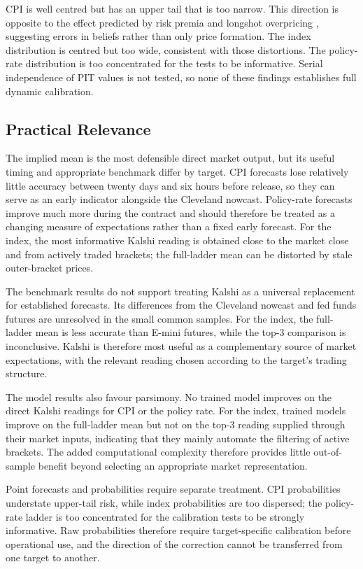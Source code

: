 \documentclass[12pt,a4paper]{report}
\begin{document}
CPI is well centred but has an upper tail that is too narrow. This direction is
opposite to the effect predicted by risk premia and longshot overpricing
\parencite{kitsul2013, burgi2025}, suggesting errors in beliefs rather than only
price formation. The index distribution is centred but too wide, consistent
with those distortions. The policy-rate distribution is too concentrated for
the tests to be informative. Serial independence of PIT values is not tested,
so none of these findings establishes full dynamic calibration.

\subsection{Practical Relevance}

The implied mean is the most defensible direct market output, but its useful
timing and appropriate benchmark differ by target. CPI forecasts lose relatively
little accuracy between twenty days and six hours before release, so they can
serve as an early indicator alongside the Cleveland nowcast. Policy-rate
forecasts improve much more during the contract and should therefore be treated
as a changing measure of expectations rather than a fixed early forecast.
For the index, the most informative Kalshi reading is obtained close to the
market close and from actively traded brackets; the full-ladder mean can be
distorted by stale outer-bracket prices.

The benchmark results do not support treating Kalshi as a universal replacement
for established forecasts. Its differences from the Cleveland nowcast and fed
funds futures are unresolved in the small common samples. For the index, the
full-ladder mean is less accurate than E-mini futures, while the top-3 comparison
is inconclusive. Kalshi is therefore most useful as a complementary source of
market expectations, with the relevant reading chosen according to the target's
trading structure.

The model results also favour parsimony. No trained model improves on the direct
Kalshi readings for CPI or the policy rate. For the index, trained models improve
on the full-ladder mean but not on the top-3 reading supplied through their
market inputs, indicating that they mainly automate the filtering of active
brackets. The added computational complexity therefore provides little
out-of-sample benefit beyond selecting an appropriate market representation.

Point forecasts and probabilities require separate treatment. CPI probabilities
understate upper-tail risk, while index probabilities are too dispersed; the
policy-rate ladder is too concentrated for the calibration tests to be strongly
informative. Raw probabilities therefore require target-specific calibration
before operational use, and the direction of the correction cannot be transferred
from one target to another.
\end{document}
